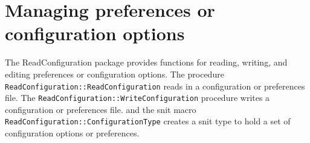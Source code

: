 
\chapter{Managing preferences or configuration options}
\label{chapt:ReadConfiguration}

The ReadConfiguration package provides functions for reading, writing,
and editing preferences or configuration options.  The procedure
\lstinline=ReadConfiguration::ReadConfiguration= reads in a configuration or preferences file. The
\lstinline=ReadConfiguration::WriteConfiguration= procedure writes a configuration or preferences file. and
the snit macro
\lstinline=ReadConfiguration::ConfigurationType= creates a snit type to hold a set of configuration options or
preferences.

